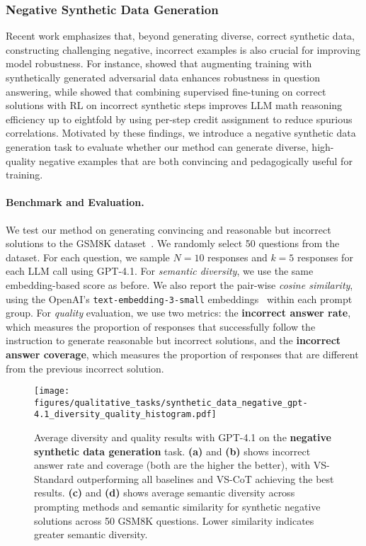 \subsubsection{Negative Synthetic Data Generation}
\label{sec:negative synthetic data}
Recent work emphasizes that, beyond generating diverse, correct synthetic data, constructing challenging negative, incorrect examples is also crucial for improving model robustness. For instance, \citet{Bartolo_2021} showed that augmenting training with synthetically generated adversarial data enhances robustness in question answering, while \citet{setlur2024rlincorrectsyntheticdata} showed that combining supervised fine-tuning on correct solutions with RL on incorrect synthetic steps improves LLM math reasoning efficiency up to eightfold by using per-step credit assignment to reduce spurious correlations. 
Motivated by these findings, we introduce a negative synthetic data generation task to evaluate whether our method can generate diverse, high-quality negative examples that are both convincing and pedagogically useful for training. 

\paragraph{Benchmark and Evaluation.} We test our method on generating convincing and reasonable but incorrect solutions to the GSM8K dataset~\citep{cobbe2021trainingverifierssolvemath}. We randomly select 50 questions from the dataset. For each question, we sample $N=10$ responses and $k=5$ responses for each LLM call using GPT-4.1. For \textit{semantic diversity}, we use the same embedding-based score as before. We also report the pair-wise \textit{cosine similarity}, using the OpenAI’s \texttt{text-embedding-3-small} embeddings~\citep{openai2024embedding} within each prompt group. 
For \textit{quality} evaluation, we use two metrics: the \textbf{incorrect answer rate}, which measures the proportion of responses that successfully follow the instruction to generate reasonable but incorrect solutions, and the \textbf{incorrect answer coverage}, which measures the proportion of responses that are different from the previous incorrect solution.

\begin{figure*}[h]
  \centering
  \texttt{[image: figures/qualitative\_tasks/synthetic\_data\_negative\_gpt-4.1\_diversity\_quality\_histogram.pdf]}
  \caption{Average diversity and quality results with GPT-4.1 on the \textbf{negative synthetic data generation} task.
  \textbf{(a)} and \textbf{(b)} shows incorrect answer rate and coverage (both are the higher the better), with VS-Standard outperforming all baselines and VS-CoT achieving the best results.
  \textbf{(c)} and \textbf{(d)} shows average semantic diversity across prompting methods and semantic similarity for synthetic negative solutions across 50 GSM8K questions. Lower similarity indicates greater semantic diversity. 
  }
  \label{fig:synthetic_negative_combined_results}
\end{figure*}

